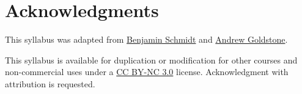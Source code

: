 \section{Acknowledgments}\label{acknowledgments}

This syllabus was adapted from
\href{https://github.com/bmschmidt/syllabus}{Benjamin Schmidt} and
\href{https://github.com/agoldst/tex}{Andrew Goldstone}.

This syllabus is available for duplication or modification for other
courses and non-commercial uses under a
\href{http://creativecommons.org/licenses/by-nc/3.0/}{CC BY-NC 3.0}
license. Acknowledgment with attribution is requested.
